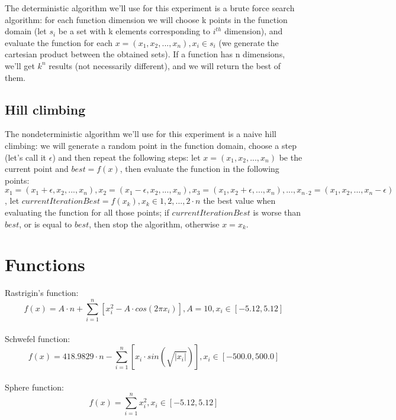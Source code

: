 \documentclass{article}
\begin{document}
The deterministic algorithm we'll use for this experiment is a brute force search algorithm: for each function dimension we will choose k points in the function domain (let $s_i$ be a set with k elements corresponding to $i^{th}$ dimension), and evaluate the function for each $x = (x_1,x_2,...,x_n), x_i \in s_i$ (we generate the cartesian product between the obtained sets). If a function has n dimensions, we'll get $k^n$ results (not necessarily different), and we will return the best of them.

\subsection{Hill climbing}

The nondeterministic algorithm we'll use for this experiment is a naive hill climbing: we will generate a random point in the function domain, choose a step (let's call it $\epsilon$) and then repeat the following steps: let $x = (x_1,x_2,...,x_n)$ be the current point and $best = f(x)$, then evaluate the function in the following points: $x_1 = (x_1+\epsilon,x_2,...,x_n), x_2 = (x_1-\epsilon,x_2,...,x_n), x_3 = (x_1,x_2+\epsilon,...,x_n), ..., x_{n\cdot 2} = (x_1,x_2,...,x_n-\epsilon)$, let $currentIterationBest = f(x_k), x_k \in {1, 2, ..., 2\cdot n}$ the best value when evaluating the function for all those points; if $currentIterationBest$ is worse than $best$, or is equal to $best$, then stop the algorithm, otherwise $x = x_k$.

\section{Functions}

Rastrigin's function:
$$ f(x) = A \cdot n + \sum_{i=1}^n \left[ x_i^2 - A \cdot cos(2 \pi x_i) \right],
A = 10, x_i \in \left[ -5.12, 5.12 \right]$$
\\

Schwefel function:
$$ f(x) = 418.9829\cdot n - \sum_{i=1}^n \left[ x_i \cdot sin(\sqrt{|x_i|}) \right], x_i \in \left[ -500.0, 500.0\right]$$
\\


Sphere function:
$$ f(x) = \sum_{i=1}^{n} x_i^2, x_i \in \left[ -5.12, 5.12 \right]$$
\\
\end{document}
